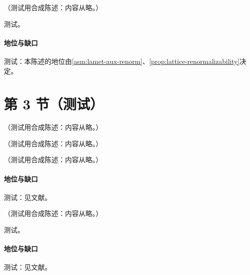 \begin{proposition}\label{prop:lamet-ad-spacelike}
（测试用合成陈述：内容从略。）
\end{proposition}
\begin{proofsketch}测试。\end{proofsketch}
\paragraph{地位与缺口}测试：本陈述的地位由\cref{asm:lamet-aux-renorm}、\cref{prop:lattice-renormalizability}决定。

\section{第 3 节（测试）}\label{sec:lattice-moments}

\begin{definition}[准关联函数的重整化方案]\label{def:lamet-schemes}
（测试用合成陈述：内容从略。）
\end{definition}

\begin{lemma}\label{lem:lamet-lorentzian}
（测试用合成陈述：内容从略。）
\end{lemma}

\begin{proposition}\label{prop:lamet-lrr}
（测试用合成陈述：内容从略。）
\end{proposition}
\paragraph{地位与缺口}测试：见文献。

\begin{proposition}\label{prop:lamet-euclid-minkowski}
（测试用合成陈述：内容从略。）
\end{proposition}
\begin{proofsketch}测试。\end{proofsketch}
\paragraph{地位与缺口}测试：见文献。


